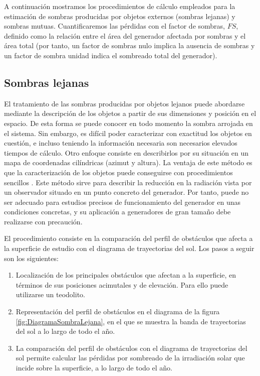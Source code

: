 A continuación mostramos los procedimientos de cálculo empleados para
la estimación de sombras producidas por objetos externos (sombras
lejanas) y sombras mutuas. Cuantificaremos las pérdidas con el factor
de sombras, $FS$,
definido como la relación entre el área del generador afectada por
sombras y el área total (por tanto, un factor de sombras nulo implica
la ausencia de sombras y un factor de sombra unidad indica el sombreado
total del generador).


\subsection{Sombras lejanas\label{sub:Sombras-lejanas}}

El tratamiento de las sombras producidas por objetos lejanos puede
abordarse mediante la descripción de los objetos a partir de sus dimensiones
y posición en el espacio. De esta forma se puede conocer en todo momento
la sombra arrojada en el sistema. Sin embargo, es difícil poder caracterizar
con exactitud los objetos en cuestión, e incluso teniendo la información
necesaria son necesarios elevados tiempos de cálculo. Otro enfoque
consiste en describirlos por su situación en un mapa de coordenadas
cilíndricas (azimut y altura). La ventaja de este método es que la
caracterización de los objetos puede conseguirse con procedimientos
sencillos \cite{Caamano1998,Quaschning.Hanitsch1998}. Este método
sirve para describir la reducción en la radiación vista por un observador
situado en un punto concreto del generador. Por tanto, puede no ser
adecuado para estudios precisos de funcionamiento del generador en
unas condiciones concretas, y su aplicación a generadores de gran
tamaño debe realizarse con precaución. 

El procedimiento consiste en la comparación del perfil de obstáculos
que afecta a la superficie de estudio con el diagrama de trayectorias
del sol. Los pasos a seguir son los siguientes:
\begin{enumerate}
\item Localización de los principales obstáculos que afectan a la
  superficie, en términos de sus posiciones acimutales y de
  elevación. Para ello puede utilizarse un teodolito.
\item Representación del perfil de obstáculos en el diagrama de la
  figura \ref{fig:DiagramaSombraLejana}, en el que se muestra la banda
  de trayectorias del sol a lo largo de todo el año.
\item La comparación del perfil de obstáculos con el diagrama de
  trayectorias del sol permite calcular las pérdidas por sombreado de
  la irradiación solar que incide sobre la superficie, a lo largo de
  todo el año. 
\end{enumerate}

